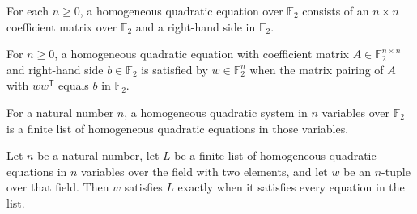 \begin{definition}
\label{FABL.HomogeneousQuadraticEquation}
\leanok
{}
For each $n\ge 0$, a homogeneous quadratic equation over $\mathbb F_2$ consists of an
$n\times n$ coefficient matrix over $\mathbb F_2$ and a right-hand side in $\mathbb
F_2$.
\end{definition}

\begin{definition}
\label{FABL.HomogeneousQuadraticEquation.SatisfiedBy}
\leanok
{}
For $n\ge 0$, a homogeneous quadratic equation with coefficient matrix $A\in\mathbb
F_2^{n\times n}$ and right-hand side $b\in\mathbb F_2$ is satisfied by $w\in\mathbb
F_2^n$ when the matrix pairing of $A$ with $ww^{\mathsf T}$ equals $b$ in $\mathbb F_2$.
\end{definition}

\begin{definition}
\label{FABL.HomogeneousQuadraticSystem}
\leanok
{}
For a natural number $n$, a homogeneous quadratic system in $n$ variables over $\mathbb{F}_2$ is
a finite list of homogeneous quadratic equations in those variables.
\end{definition}

\begin{definition}
\label{FABL.SatisfiesHomogeneousQuadraticSystem}
\leanok
{}
Let $n$ be a natural number, let $L$ be a finite list of homogeneous quadratic equations
in $n$ variables over the field with two elements, and let $w$ be an $n$-tuple over that
field. Then $w$ satisfies $L$ exactly when it satisfies every equation in the list.
\end{definition}

